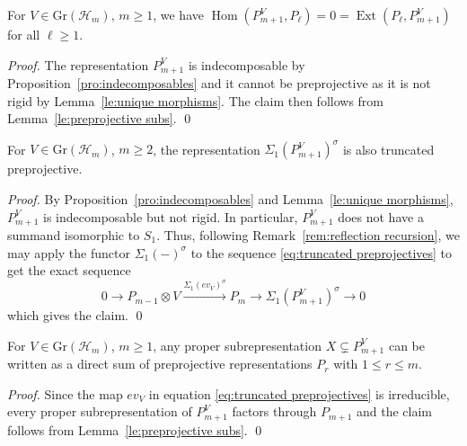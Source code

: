 \documentclass[smallextended,envcountsect,envcountsame]{svjour3}
\numberwithin{equation}{section}
\newcommand{\cH}{\mathcal{H}}
\newcommand{\codim}{\operatorname{codim}}
\newcommand{\Ext}{\operatorname{Ext}}
\newcommand{\Gr}{\mathrm{Gr}}
\newcommand{\Hom}{\operatorname{Hom}}
\begin{document}
\begin{lemma}
  \label{le:basic homological properties}
  For $V\in\Gr(\cH_m)$, $m\ge1$, we have $\Hom(P_{m+1}^V,P_\ell)=0=\Ext(P_\ell,P_{m+1}^V)$ for all $\ell\ge1$.
\end{lemma}
\begin{proof}
   The representation $P_{m+1}^V$ is indecomposable by Proposition~\ref{pro:indecomposables} and it cannot be preprojective as it is not rigid by Lemma~\ref{le:unique morphisms}.
   The claim then follows from Lemma~\ref{le:preprojective subs}.
\qed\end{proof}

\begin{lemma}
  \label{le:reflected truncated preprojectives}
  For $V\in\Gr(\cH_m)$, $m\ge2$, the representation $\Sigma_1(P_{m+1}^V)^\sigma$ is also truncated preprojective.
\end{lemma}
\begin{proof}
  By Proposition~\ref{pro:indecomposables} and Lemma~\ref{le:unique morphisms}, $P_{m+1}^V$ is indecomposable but not rigid.
  In particular, $P_{m+1}^V$ does not have a summand isomorphic to $S_1$.
  Thus, following Remark~\ref{rem:reflection recursion}, we may apply the functor $\Sigma_1(-)^\sigma$ to the sequence \eqref{eq:truncated preprojectives} to get the exact sequence
  \[0\longrightarrow P_{m-1}\otimes V\xrightarrow{\Sigma_1(ev_V)^\sigma} P_m\longrightarrow \Sigma_1(P_{m+1}^V)^\sigma\longrightarrow 0\]
  which gives the claim.
\qed\end{proof}

\begin{lemma}
  \label{le:projective subrepresentations}
  For $V\in \Gr(\cH_m)$, $m\ge1$, any proper subrepresentation $X\subsetneq P_{m+1}^V$ can be written as a direct sum of preprojective representations $P_r$ with $1\le r\le m$.
\end{lemma}
\begin{proof}
  Since the map $ev_V$ in equation \eqref{eq:truncated preprojectives} is irreducible, every proper subrepresentation of $P_{m+1}^V$ factors through $P_{m+1}$ and the claim follows from Lemma~\ref{le:preprojective subs}.
\qed\end{proof}

\end{document}
